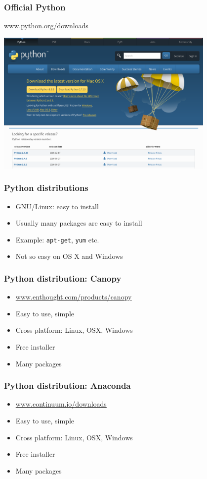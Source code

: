 \documentclass[14pt,compress]{beamer}
\newcommand{\typ}[1]{\lstinline{#1}}
\begin{document}
\begin{frame}[plain]
  \frametitle{Official Python}
  \begin{center}
    \url{www.python.org/downloads}

    \includegraphics[height=2.75in]{data/intro/python_download}
  \end{center}
\end{frame}

\begin{frame}
  \frametitle{Python distributions}
  \begin{itemize}
  \item GNU/Linux: easy to install
  \item Usually many packages are easy to install
  \item Example: \typ{apt-get}, \typ{yum} etc.
  \item Not so easy on OS X and Windows
  \end{itemize}
\end{frame}

\begin{frame}
  \frametitle{Python distribution: Canopy}
  \begin{itemize}
  \item \url{www.enthought.com/products/canopy}
  \item Easy to use, simple
  \item Cross platform: Linux, OSX, Windows
  \item Free installer
  \item Many packages
  \end{itemize}
\end{frame}

\begin{frame}
  \frametitle{Python distribution: Anaconda}
  \begin{itemize}
  \item \url{www.continuum.io/downloads}
  \item Easy to use, simple
  \item Cross platform: Linux, OSX, Windows
  \item Free installer
  \item Many packages
  \end{itemize}
\end{frame}
\end{document}
